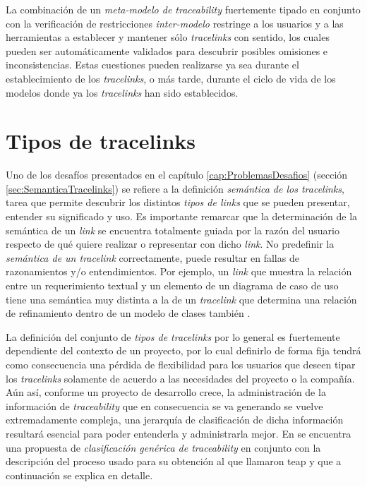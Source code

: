 \documentclass[a4paper,12pt,oneside,spanish]{book}
\begin{document}
La combinación de un \textit{meta-modelo de traceability} fuertemente tipado en conjunto con la verificación de restricciones \textit{inter-modelo} restringe a los usuarios y a las herramientas a establecer y mantener sólo \textit{tracelinks} con sentido, los cuales pueden ser automáticamente validados para descubrir posibles omisiones e inconsistencias. Estas cuestiones pueden realizarse ya sea durante el establecimiento de los \textit{tracelinks}, o más tarde, durante el ciclo de vida de los modelos donde ya los \textit{tracelinks} han sido establecidos.




\section{Tipos de tracelinks}

Uno de los desafíos presentados en el capítulo \ref{cap:ProblemasDesafios} (sección \ref{sec:SemanticaTracelinks}) se refiere a la definición  \textit{semántica de los tracelinks}, tarea que permite descubrir los distintos \textit{tipos de links} que se pueden presentar, entender su significado y uso. Es importante remarcar que la determinación de la semántica de un \textit{link} se encuentra totalmente guiada por la razón del usuario respecto de qué quiere realizar o representar con dicho \textit{link}. No predefinir la \textit{semántica de un tracelink} correctamente, puede resultar en fallas de razonamientos y/o entendimientos. Por ejemplo, un \textit{link} que muestra la relación entre un requerimiento textual y un elemento de un diagrama de caso de uso  tiene una semántica muy distinta a la de un \textit{tracelink} que determina una relación de refinamiento dentro de un modelo de clases también .

La definición del conjunto de \textit{tipos de tracelinks} por lo general es fuertemente dependiente del contexto de un proyecto, por lo cual definirlo de forma fija tendrá como consecuencia una pérdida de flexibilidad para los usuarios que deseen tipar los \textit{tracelinks} solamente de acuerdo a las necesidades del proyecto o la compañía. Aún así, conforme un proyecto de desarrollo crece, la administración de la información de \textit{traceability} que en consecuencia se va generando se vuelve extremadamente compleja, una jerarquía de clasificación de dicha información resultará esencial para poder entenderla y administrarla mejor. En \cite{PaigeOlsenKolovosZschalerPower} se encuentra una propuesta de \textit{clasificación genérica de traceability} en conjunto con la descripción del proceso usado para su obtención al que llamaron \gls{teap} y que a continuación se explica en detalle.
\end{document}
